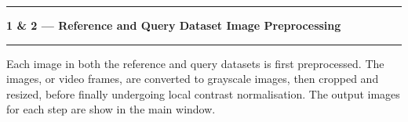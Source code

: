 \noindent\rule{\textwidth}{1pt}
\indent \textbf{1 \& 2 --- Reference and Query Dataset Image Preprocessing}
\noindent\rule{\textwidth}{1pt}
\smallskip
\parbox{\textwidth}{Each image in both the reference and query datasets is first preprocessed. The images, or video frames, are converted to grayscale images, then cropped and resized, before finally undergoing local contrast normalisation. The output images for each step are show in the main window.}
\smallskip
